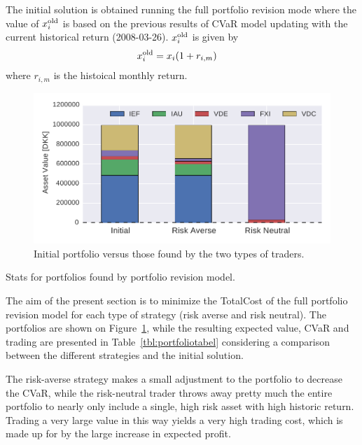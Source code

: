 The initial solution is obtained running the full portfolio revision mode where the value of $x^{\textup{old}}_{i}$  is based on the previous results of CVaR model updating with the current historical return (2008-03-26). 
$x^{\textup{old}}_{i}$  is given by
\begin{align}
x^{\textup{old}}_{i} &= x_{i} (1+ r_{i,m})
\end{align}
where $r_{i,m}$ is the histoical monthly return.

\begin{figure}[tpbh]
\centering
\includegraphics[width=1.0\textwidth]{../pic/portfoliorevision_portfolio.pdf}
\caption{Initial portfolio versus those found by the two types of traders.}
\label{fig:prevpf}
\end{figure}

\begin{table}
\caption{Stats for portfolios found by portfolio revision model.}\label{tbl:portfoliotabel}
\centering

\end{table}

The aim of the present section is to minimize the TotalCost of the full portfolio revision model for each type of strategy (risk averse and risk neutral).
The portfolios are shown on Figure~\ref{fig:prevpf}, while the resulting expected value, CVaR and trading are presented in Table~\ref{tbl:portfoliotabel} considering a comparison between the different strategies and the initial solution. 

The risk-averse strategy makes a small adjustment to the portfolio to decrease the CVaR, while the risk-neutral trader throws away pretty much the entire portfolio to nearly only include a single, high risk asset with high historic return.
Trading a very large value in this way yields a very high trading cost, which is made up for by the large increase in expected profit.